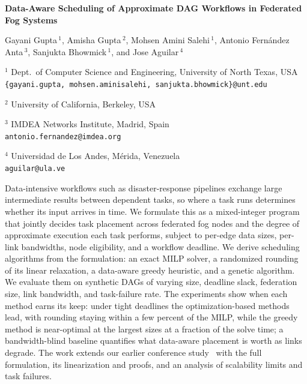 \documentclass[11pt]{article}
\begin{document}
\begin{center}
    \Large{\textbf{Data-Aware Scheduling of Approximate DAG Workflows in Federated Fog Systems}}

    \vspace{0.5cm}

    \large{Gayani Gupta$\,^1$, Amisha Gupta$\,^2$, Mohsen Amini Salehi$\,^1$,
           Antonio Fern\'andez Anta$\,^3$, Sanjukta Bhowmick$\,^1$, and Jose Aguilar$\,^4$}

    \vspace{0.5cm}

    \normalsize

    $^1$ Dept.\ of Computer Science and Engineering, University of North Texas, USA\\
    \texttt{\{gayani.gupta, mohsen.aminisalehi, sanjukta.bhowmick\}@unt.edu}

    $^2$ University of California, Berkeley, USA

    $^3$ IMDEA Networks Institute, Madrid, Spain\\
    \texttt{antonio.fernandez@imdea.org}

    $^4$ Universidad de Los Andes, M\'erida, Venezuela\\
    \texttt{aguilar@ula.ve}

    \vspace{0.6cm}

\end{center}

Data-intensive workflows such as disaster-response pipelines exchange large
intermediate results between dependent tasks, so where a task runs determines
whether its input arrives in time. We formulate this as a mixed-integer
program that jointly decides task placement across federated fog nodes and
the degree of approximate execution each task performs, subject to per-edge
data sizes, per-link bandwidths, node eligibility, and a workflow deadline.
We derive scheduling algorithms from the formulation: an exact MILP solver,
a randomized rounding of its linear relaxation, a data-aware greedy heuristic,
and a genetic algorithm. We evaluate them on synthetic DAGs of varying size,
deadline slack, federation size, link bandwidth, and task-failure rate. The
experiments show when each method earns its keep: under tight deadlines the
optimization-based methods lead, with rounding staying within a few percent of
the MILP, while the greedy method is near-optimal at the largest sizes at a
fraction of the solve time; a bandwidth-blind baseline quantifies what
data-aware placement is worth as links degrade. The work extends our earlier
conference study~\cite{gupta2025efficient} with the full formulation, its
linearization and proofs, and an analysis of scalability limits and task
failures.



\end{document}
